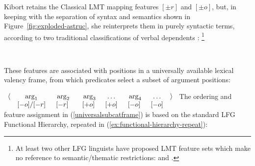 \documentclass[output=paper]{langscibook}
\begin{document}
Kibort retains the Classical LMT mapping features $[\pm r]$ and $[\pm o]$, but,
in keeping with the separation of syntax and semantics shown in
Figure~\ref{fig:exploded-astruc}, she reinterprets them in purely syntactic
terms, according to two traditional classifications of verbal dependents
\citep[266]{kibort14}:%
\footnote{At least two other LFG linguists have proposed LMT feature sets which
  make no reference to semantic\slash thematic restrictions:
  \citet{alsina1996the-role} and \citet{Hemmings2012}.}
%

\begin{exe}\ex\label{featuredefinitions}
~
\end{exe}
%
These features are associated with positions in a universally available lexical
valency frame, from which predicates select a subset of argument positions:

\ea\label{universalsubcatframe}
\ensuremath{%
\begin{array}[t]{cccccccc}
\langle & \textnormal{arg}_1 & ~~\textnormal{arg}_2~ & ~~\textnormal{arg}_3~ & ~\dots~ & ~~\textnormal{arg}_4~ & ~\dots~ & \rangle\\
				& [-o]/[-r]    & [-r]         & [+o]    & [+o]      & [-o]     & [-o]   &  \\
\end{array}
}
\z
%
The ordering and feature assignment in (\ref{universalsubcatframe}) is based on
the standard LFG Functional Hierarchy, repeated in
(\ref{ex:functional-hierarchy-repeat}):
\end{document}

